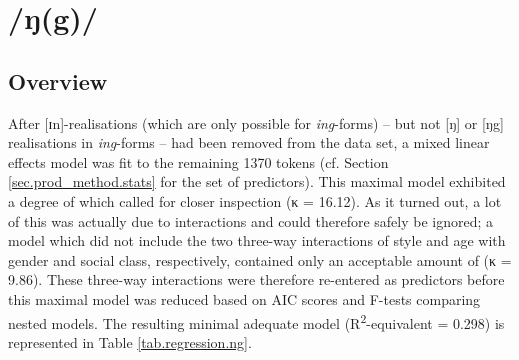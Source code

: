 \section{/ŋ(g)/}
\label{prod.res.con.ng}

\subsection{Overview}
\label{sec.prod.res.con.ng.overview}

After [ɪn]-realisations (which are only possible for \emph{ing}-forms) – but not [ŋ] or [ŋg] realisations in \emph{ing}-forms – had been removed from the data set, a mixed linear effects model was fit to the remaining 1370 tokens (cf. Section \ref{sec.prod_method.stats} for the set of predictors).
This maximal model exhibited a degree of  which called for closer inspection (κ = 16.12).
As it turned out, a lot of this  was actually due to interactions and could therefore safely be ignored; a model which did not include the two three-way interactions of style and age with gender and social class, respectively, contained only an acceptable amount of  (κ = 9.86).
These three-way interactions were therefore re-entered as predictors before this maximal model was reduced based on AIC scores and F-tests comparing nested models.
The resulting minimal adequate model (R\textsuperscript{2}-equivalent = 0.298) is represented in Table \ref{tab.regression.ng}.

